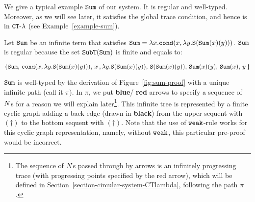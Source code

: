 
We give a typical example ${\tt Sum}$ of our system. It is regular and well-typed.
Moreover, as we will see later, it satisfies the global trace condition,
and hence is in ${ {\tt CT}\mbox{-}\lambda}$ (see Example~\ref{example-sum}). 


\begin{example}\label{example-sum-first}
Let ${\tt Sum}$ be an infinite term that satisfies 
${\tt Sum} = \lambda x.{\tt cond}(x,\lambda y.{\tt S}({\tt Sum}(x)(y)))$.
${\tt Sum}$ is regular because the set ${\tt SubT}({\tt Sum})$ is finite and equals to: 
\begin{center}
  $\{{\tt Sum},\,{\tt cond}(x,\lambda y.{\tt S}({\tt Sum}(x)(y))),\,x\,,\lambda y.{\tt S}({\tt Sum}(x)(y)),\,{\tt S}({\tt Sum}(x)(y)),\,{\tt Sum}(x)(y),\,{\tt Sum}(x),\,y\,\}$
\end{center}
${\tt Sum}$ is well-typed by the derivation of Figure~\ref{fig:sum-proof}
with a unique infinite path (call it $\pi$).
In $\pi$, we put {\color{blue} \bf blue}/{\color{red} \bf red}
arrows to specify a sequence of ${N}$s for a reason we will explain later\footnote{
The sequence of ${N}$s passed through by arrows is an infinitely progressing trace (with progressing points specified by the red arrow), 
which will be defined in Section~\ref{section-circular-system-CTlambda}, 
following the path $\pi$.}.
This infinite tree is represented by a finite cyclic graph 
adding a back edge (drawn in {\color{black} \bf black}) 
from the upper sequent with $(\dagger)$
to the bottom sequent with $(\dagger)$.
Note that the use of ${\tt weak}$-rule works for this cyclic graph representation,
namely, without ${\tt weak}$, this particular pre-proof would be incorrect.


\end{example}
